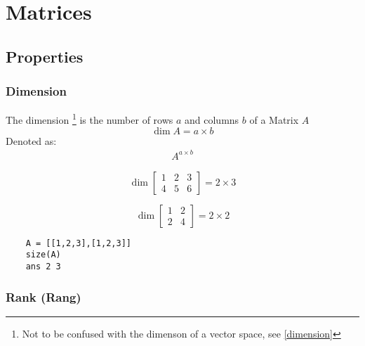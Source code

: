 \chapter{Matrices}
\section{Properties}
\subsection{Dimension}
The dimension
\footnote{Not to be confused with the dimenson of a vector space, see \ref{dimension}} is the number of rows \(a\) and columns \(b\) of a Matrix \(A\)
\begin{equation}
    \dim{A} = a \times b
\end{equation}
Denoted as:
\begin{align*}
    A^{a \times b}
\end{align*}
\begin{example}
    \begin{equation*}
        \dim{\begin{bmatrix}
                1 & 2 & 3 \\
                4 & 5 & 6
            \end{bmatrix}} = 2 \times 3
    \end{equation*}
\end{example}
\begin{example}
    \begin{equation*}
        \dim{\begin{bmatrix}
                1 & 2 \\
                2 & 4
            \end{bmatrix}}= 2 \times 2
    \end{equation*}
\end{example}
\begin{matlab}
    \begin{lstlisting}
    A = [[1,2,3],[1,2,3]]
    size(A)
    ans 2 3
    \end{lstlisting}
\end{matlab}
\subsection{Rank (Rang)} \label{rank}
